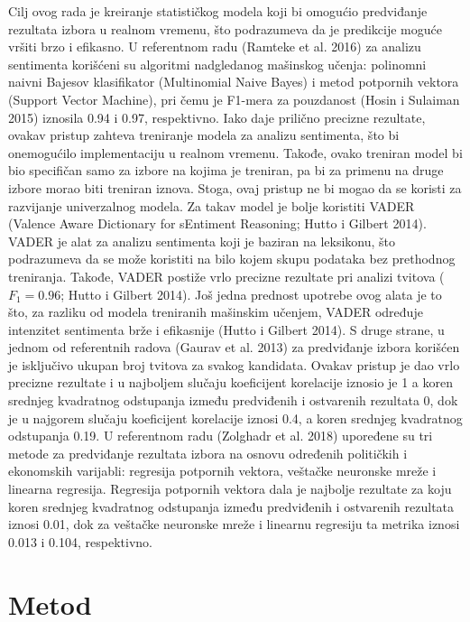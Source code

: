 \AuthorExHere

Cilj ovog rada je kreiranje statističkog modela koji bi omogućio predviđanje rezultata izbora u realnom
vremenu, što podrazumeva da je predikcije moguće vršiti brzo i efikasno. U referentnom radu
(Ramteke et al. 2016) za analizu sentimenta korišćeni su algoritmi nadgledanog mašinskog učenja:
polinomni naivni Bajesov klasifikator (Multinomial Naive Bayes) i metod potpornih vektora (Support
Vector Machine), pri čemu je F1-mera za pouzdanost (Hosin i Sulaiman 2015) iznosila 0.94 i 0.97,
respektivno. Iako daje prilično precizne rezultate, ovakav pristup zahteva treniranje modela za analizu
sentimenta, što bi onemogućilo implementaciju u realnom vremenu. Takođe, ovako treniran model bi
bio specifičan samo za izbore na kojima je treniran, pa bi za primenu na druge izbore morao biti
treniran iznova. Stoga, ovaj pristup ne bi mogao da se koristi za razvijanje univerzalnog modela. Za
takav model je bolje koristiti VADER (Valence Aware Dictionary for sEntiment Reasoning; Hutto i
Gilbert 2014). VADER je alat za analizu sentimenta koji je baziran na leksikonu, što podrazumeva da
se može koristiti na bilo kojem skupu podataka bez prethodnog treniranja. Takođe, VADER postiže
vrlo precizne rezultate pri analizi tvitova ($F_1 = 0.96$; Hutto i Gilbert 2014). Još jedna prednost upotrebe
ovog alata je to što, za razliku od modela treniranih mašinskim učenjem, VADER određuje intenzitet
sentimenta brže i efikasnije (Hutto i Gilbert 2014). S druge strane, u jednom od referentnih radova
(Gaurav et al. 2013) za predviđanje izbora korišćen je isključivo ukupan broj tvitova za svakog
kandidata. Ovakav pristup je dao vrlo precizne rezultate i u najboljem slučaju koeficijent korelacije
iznosio je 1 a koren srednjeg kvadratnog odstupanja između predviđenih i ostvarenih rezultata 0, dok
je u najgorem slučaju koeficijent korelacije iznosi 0.4, a koren srednjeg kvadratnog odstupanja 0.19.
U referentnom radu (Zolghadr et al. 2018) upoređene su tri metode za predviđanje rezultata izbora na
osnovu određenih političkih i ekonomskih varijabli: regresija potpornih vektora, veštačke neuronske
mreže i linearna regresija. Regresija potpornih vektora dala je najbolje rezultate za koju koren srednjeg
kvadratnog odstupanja između predviđenih i ostvarenih rezultata iznosi 0.01, dok za veštačke
neuronske mreže i linearnu regresiju ta metrika iznosi 0.013 i 0.104, respektivno.

\section{Metod}

